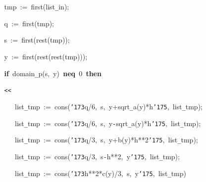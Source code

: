 \documentclass[a4paper,10pt]{article}
\def\mc{\relax}
\begin{document}
\noindent
\mbox{}{\tt\mc \ }{\tt\mc \ }{\tt\mc \ }{\tt\mc \ }{\tt\mc \ }{\tt\mc \ }{\tt\mc \ }{\tt\mc \ }{\tt\mc \ }tmp{\tt\mc \ }:={\tt\mc \ }first(list{\tt\_}in);

\noindent
\mbox{}{\tt\mc \ }{\tt\mc \ }{\tt\mc \ }{\tt\mc \ }{\tt\mc \ }{\tt\mc \ }{\tt\mc \ }{\tt\mc \ }{\tt\mc \ }q{\tt\mc \ }:={\tt\mc \ }first(tmp);

\noindent
\mbox{}{\tt\mc \ }{\tt\mc \ }{\tt\mc \ }{\tt\mc \ }{\tt\mc \ }{\tt\mc \ }{\tt\mc \ }{\tt\mc \ }{\tt\mc \ }s{\tt\mc \ }:={\tt\mc \ }first(rest(tmp));

\noindent
\mbox{}{\tt\mc \ }{\tt\mc \ }{\tt\mc \ }{\tt\mc \ }{\tt\mc \ }{\tt\mc \ }{\tt\mc \ }{\tt\mc \ }{\tt\mc \ }y{\tt\mc \ }:={\tt\mc \ }first(rest(rest(tmp)));

\noindent
\mbox{}{\tt\mc \ }{\tt\mc \ }{\tt\mc \ }{\tt\mc \ }{\tt\mc \ }{\tt\mc \ }{\tt\mc \ }{\tt\mc \ }{\tt\mc \ }\textbf{if}{\tt\mc \ }domain{\tt\_}p(s,{\tt\mc \ }y){\tt\mc \ }\textbf{neq}{\tt\mc \ }0{\tt\mc \ }\textbf{then}

\noindent
\mbox{}{\tt\mc \ }{\tt\mc \ }{\tt\mc \ }{\tt\mc \ }{\tt\mc \ }{\tt\mc \ }{\tt\mc \ }{\tt\mc \ }{\tt\mc \ }{\tt <}{\tt <}

\noindent
\mbox{}{\tt\mc \ }{\tt\mc \ }{\tt\mc \ }{\tt\mc \ }{\tt\mc \ }{\tt\mc \ }{\tt\mc \ }{\tt\mc \ }{\tt\mc \ }{\tt\mc \ }{\tt\mc \ }{\tt\mc \ }list{\tt\_}tmp{\tt\mc \ }:={\tt\mc \ }cons({\tt\char'173}q/6,{\tt\mc \ }s,{\tt\mc \ }y+sqrt{\tt\_}a(y)*h{\tt\char'175},{\tt\mc \ }list{\tt\_}tmp);

\noindent
\mbox{}{\tt\mc \ }{\tt\mc \ }{\tt\mc \ }{\tt\mc \ }{\tt\mc \ }{\tt\mc \ }{\tt\mc \ }{\tt\mc \ }{\tt\mc \ }{\tt\mc \ }{\tt\mc \ }{\tt\mc \ }list{\tt\_}tmp{\tt\mc \ }:={\tt\mc \ }cons({\tt\char'173}q/6,{\tt\mc \ }s,{\tt\mc \ }y{\tt -}sqrt{\tt\_}a(y)*h{\tt\char'175},{\tt\mc \ }list{\tt\_}tmp);

\noindent
\mbox{}{\tt\mc \ }{\tt\mc \ }{\tt\mc \ }{\tt\mc \ }{\tt\mc \ }{\tt\mc \ }{\tt\mc \ }{\tt\mc \ }{\tt\mc \ }{\tt\mc \ }{\tt\mc \ }{\tt\mc \ }list{\tt\_}tmp{\tt\mc \ }:={\tt\mc \ }cons({\tt\char'173}q/3,{\tt\mc \ }s,{\tt\mc \ }y+b(y)*h**2{\tt\char'175},{\tt\mc \ }list{\tt\_}tmp);

\noindent
\mbox{}{\tt\mc \ }{\tt\mc \ }{\tt\mc \ }{\tt\mc \ }{\tt\mc \ }{\tt\mc \ }{\tt\mc \ }{\tt\mc \ }{\tt\mc \ }{\tt\mc \ }{\tt\mc \ }{\tt\mc \ }list{\tt\_}tmp{\tt\mc \ }:={\tt\mc \ }cons({\tt\char'173}q/3,{\tt\mc \ }s{\tt -}h**2,{\tt\mc \ }y{\tt\char'175},{\tt\mc \ }list{\tt\_}tmp);

\noindent
\mbox{}{\tt\mc \ }{\tt\mc \ }{\tt\mc \ }{\tt\mc \ }{\tt\mc \ }{\tt\mc \ }{\tt\mc \ }{\tt\mc \ }{\tt\mc \ }{\tt\mc \ }{\tt\mc \ }{\tt\mc \ }list{\tt\_}tmp{\tt\mc \ }:={\tt\mc \ }cons({\tt\char'173}h**2*c(y)/3,{\tt\mc \ }s,{\tt\mc \ }y{\tt\char'175},{\tt\mc \ }list{\tt\_}tmp)
\end{document}
